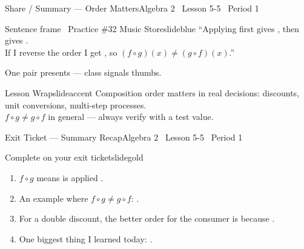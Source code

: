 \documentclass[aspectratio=169, 11pt]{beamer}
\begin{document}
\begin{frame}{Share / Summary --- Order Matters}{Algebra 2 \textperiodcentered\ Lesson 5-5 \textperiodcentered\ Period 1}
\vspace{0.2cm}
\begin{projcard}{Sentence frame \textperiodcentered\ Practice \#32 Music Store}{slideblue}
``Applying \underline{\hspace{1.5cm}} first gives \underline{\hspace{1.5cm}},
then \underline{\hspace{1.5cm}} gives \underline{\hspace{1.5cm}}.\\
If I reverse the order I get \underline{\hspace{1.5cm}},
so \((f\circ g)(x) \neq (g\circ f)(x)\).''

\vspace{0.15cm}
\small One pair presents --- class signals thumbs.
\end{projcard}

\vspace{0.15cm}
\begin{projcard}{Lesson Wrap}{slideaccent}
Composition order matters in real decisions: discounts, unit conversions, multi-step processes.\\
\(f\circ g \neq g\circ f\) in general --- always verify with a test value.
\end{projcard}
\end{frame}

\begin{frame}{Exit Ticket --- Summary Recap}{Algebra 2 \textperiodcentered\ Lesson 5-5 \textperiodcentered\ Period 1}
\vspace{0.2cm}
\begin{projcard}{Complete on your exit ticket}{slidegold}
\begin{enumerate}
  \setlength{\itemsep}{0.2cm}
  \item \(f\circ g\) means \underline{\hspace{4cm}} is applied \underline{\hspace{2cm}}.
  \item An example where \(f\circ g \neq g\circ f\): \underline{\hspace{4cm}}.
  \item For a double discount, the better order for the consumer is \underline{\hspace{2cm}} because \underline{\hspace{3cm}}.
  \item One biggest thing I learned today: \underline{\hspace{5cm}}.
\end{enumerate}
\end{projcard}
\end{frame}
\end{document}
